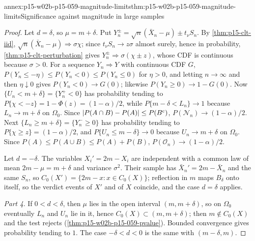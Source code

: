 \begin{annexitem}{annex:p15-w02b-p15-059-magnitude-limits}{thm:p15-w02b-p15-059-magnitude-limits}{Significance against magnitude in large samples}
\begin{proof}
Let \(d=\delta\), so \(\mu=m+\delta\). Put
\(Y_n^\pm=\sqrt n(\bar X_n-\mu)\pm t_\nu S_n\). By \cref{thm:p15-clt-iid},
\(\sqrt n(\bar X_n-\mu)\Rightarrow\sigma\chi\); since \(t_\nu S_n\to
z\sigma\) almost surely, hence in probability,
\cref{thm:p15-clt-perturbation} gives \(Y_n^\pm\Rightarrow\sigma(\chi\pm
z)\), whose CDF is continuous because \(\sigma>0\). For a sequence
\(Y_n\Rightarrow Y\) with continuous CDF \(G\),
\(P(Y_n\leq-\eta)\leq P(Y_n<0)\leq P(Y_n\leq0)\) for \(\eta>0\), and
letting \(n\to\infty\) and then \(\eta\downarrow0\) gives
\(P(Y_n<0)\to G(0)\); likewise \(P(Y_n\geq0)\to1-G(0)\). Now
\(\{U_n<m+\delta\}=\{Y_n^+<0\}\) has probability tending to
\(P\{\chi<-z\}=1-\Phi(z)=(1-\alpha)/2\), while
\(P\{m-\delta<L_n\}\to1\) because \(L_n\to m+\delta\) on \(\Omega_0\).
Since \(|P(A\cap B)-P(A)|\leq P(B^{\rm c})\), \(P(\mathcal N_n)\to
(1-\alpha)/2\). Next \(\{L_n\geq m+\delta\}=\{Y_n^-\geq0\}\) has
probability tending to \(P\{\chi\geq z\}=(1-\alpha)/2\), and
\(P\{U_n\leq m-\delta\}\to0\) because \(U_n\to m+\delta\) on
\(\Omega_0\). Since \(P(A)\leq P(A\cup B)\leq P(A)+P(B)\),
\(P(\mathcal O_n)\to(1-\alpha)/2\).

Let \(d=-\delta\). The variables \(X_i'=2m-X_i\) are independent with a
common law of mean \(2m-\mu=m+\delta\) and variance \(\sigma^2\). Their
sample has \(\bar X_n'=2m-\bar X_n\) and the same \(S_n\), so
\(C_0(X')=\{2m-x:x\in C_0(X)\}\); reflection in \(m\) maps \(B_\delta\)
onto itself, so the verdict events of \(X'\) and of \(X\) coincide, and the
case \(d=\delta\) applies.

\emph{Part 4.} If \(0<d<\delta\), then \(\mu\) lies in the open interval
\((m,m+\delta)\), so on \(\Omega_0\) eventually \(L_n\) and \(U_n\) lie in
it, hence \(C_0(X)\subset(m,m+\delta)\); then \(m\notin C_0(X)\) and the
test rejects (\cref{thm:p15-w02b-p15-059-pvalue}). Bounded convergence
gives probability tending to \(1\). The case \(-\delta<d<0\) is the same
with \((m-\delta,m)\).
\end{proof}
\end{annexitem}


